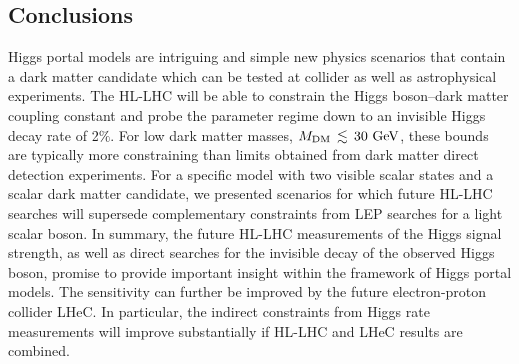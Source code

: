 \documentclass[../report.tex]{subfiles}
\begin{document}
\subsection{Conclusions}
\label{sec6:conclusions}

Higgs portal models are intriguing and simple new physics scenarios that contain a dark matter candidate which can be tested at collider as well as astrophysical experiments. The HL-LHC will be able to constrain the Higgs boson--dark matter coupling constant and probe the parameter regime down to an invisible Higgs decay rate of 2$\%$. For low dark matter masses, $M_\text{DM}\,\lesssim\,30~\text{GeV}$, these bounds are typically more constraining than limits obtained from dark matter direct detection experiments. For a specific model with two visible scalar states and a scalar dark matter candidate, we presented scenarios for which future HL-LHC {searches} will supersede complementary constraints from LEP searches for a light scalar boson. In summary, the future HL-LHC measurements of the Higgs signal strength, as well as {direct searches} for the invisible decay of the observed Higgs boson, promise to provide important insight within the framework of Higgs portal models. {The sensitivity can further be improved by the future electron-proton collider LHeC. In particular, the indirect constraints from Higgs rate measurements will improve substantially if HL-LHC and LHeC results are combined.}
\end{document}
